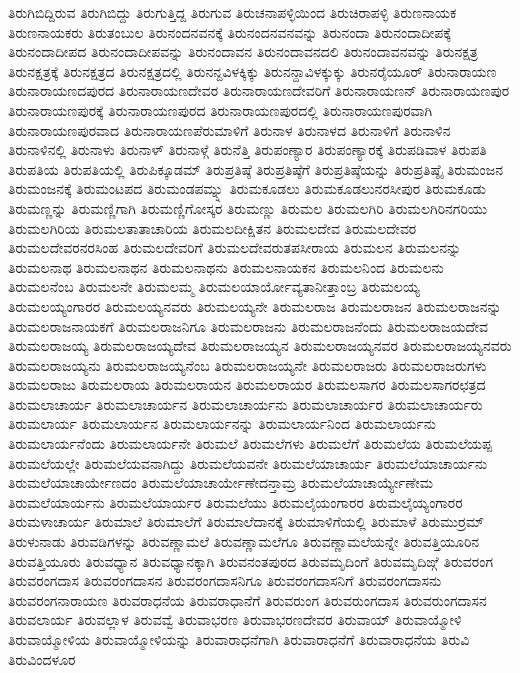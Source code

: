 {ತಿರುಗಿಬಿದ್ದಿರುವ
ತಿರುಗಿಬಿದ್ದು
ತಿರುಗುತ್ತಿದ್ದ
ತಿರುಗುವ
ತಿರುಚನಾಪಳ್ಳಿಯಿಂದ
ತಿರುಚಿರಾಪಳ್ಳಿ
ತಿರುಣನಾಯಕ
ತಿರುಣನಾಯಕರು
ತಿರುತಂಬುಲ
ತಿರುನಂದನವನಕ್ಕೆ
ತಿರುನಂದನವನವನ್ನು
ತಿರುನಂದಾ
ತಿರುನಂದಾದೀಪಕ್ಕೆ
ತಿರುನಂದಾದೀಪದ
ತಿರುನಂದಾದೀಪವನ್ನು
ತಿರುನಂದಾವನ
ತಿರುನಂದಾವನದಲಿ
ತಿರುನಂದಾವನವನ್ನು
ತಿರುನಕ್ಷತ್ರ
ತಿರುನಕ್ಷತ್ರಕ್ಕೆ
ತಿರುನಕ್ಷತ್ರದ
ತಿರುನಕ್ಷತ್ರದಲ್ಲಿ
ತಿರುನನ್ದವಿಳಕ್ಕಿಕ್ಕು
ತಿರುನನ್ದಾವಿಳಕ್ಕುಕ್ಕು
ತಿರುನರೈಯೂರ್
ತಿರುನಾರಾಯಣ
ತಿರುನಾರಾಯಣದಪುರದ
ತಿರುನಾರಾಯಣದೇವರ
ತಿರುನಾರಾಯಣದೇವರಿಗೆ
ತಿರುನಾರಾಯಣನ್
ತಿರುನಾರಾಯಣಪುರ
ತಿರುನಾರಾಯಣಪುರಕ್ಕೆ
ತಿರುನಾರಾಯಣಪುರದ
ತಿರುನಾರಾಯಣಪುರದಲ್ಲಿ
ತಿರುನಾರಾಯಣಪುರವಾಗಿ
ತಿರುನಾರಾಯಣಪುರವಾದ
ತಿರುನಾರಾಯಣಪೆರುಮಾಳಿಗೆ
ತಿರುನಾಳ
ತಿರುನಾಳದ
ತಿರುನಾಳಿಗೆ
ತಿರುನಾಳಿನ
ತಿರುನಾಳಿನಲ್ಲಿ
ತಿರುನಾಳು
ತಿರುನಾಳ್
ತಿರುನಾಳ್ಗೆ
ತಿರುನೆತ್ತಿ
ತಿರುಪಂಣ್ಯಾರ
ತಿರುಪಂಣ್ಯಾರಕ್ಕೆ
ತಿರುಪಡಿವಾಳ
ತಿರುಪತಿ
ತಿರುಪತಿಯ
ತಿರುಪತಿಯಲ್ಲಿ
ತಿರುಪಿಕ್ಕೂಡಮ್
ತಿರುಪ್ರತಿಷ್ಠೆ
ತಿರುಪ್ರತಿಷ್ಠೆಗೆ
ತಿರುಪ್ರತಿಷ್ಠೆಯನ್ನು
ತಿರುಪ್ರತಿಷ್ಠೈ
ತಿರುಮಂಜನ
ತಿರುಮಂಜನಕ್ಕೆ
ತಿರುಮಂಟಪದ
ತಿರುಮಂಡಪಮ್ನ್ನು
ತಿರುಮಕೂಡಲು
ತಿರುಮಕೂಡಲುನರಸೀಪುರ
ತಿರುಮಕೂಡು
ತಿರುಮಣ್ಣನ್ನು
ತಿರುಮಣ್ಣಿಗಾಗಿ
ತಿರುಮಣ್ಣಿಗೋಸ್ಕರ
ತಿರುಮಣ್ಣು
ತಿರುಮಲ
ತಿರುಮಲಗಿರಿ
ತಿರುಮಲಗಿರಿನಗರಿಯು
ತಿರುಮಲಗಿರಿಯ
ತಿರುಮಲತಾತಾಚಾರಿಯ
ತಿರುಮಲದೀಕ್ಷಿತನ
ತಿರುಮಲದೇವ
ತಿರುಮಲದೇವರ
ತಿರುಮಲದೇವರನರಸಿಂಹ
ತಿರುಮಲದೇವರಿಗೆ
ತಿರುಮಲದೇವರುತಪಸೀರಾಯ
ತಿರುಮಲನ
ತಿರುಮಲನನ್ನು
ತಿರುಮಲನಾಥ
ತಿರುಮಲನಾಥನ
ತಿರುಮಲನಾಥನು
ತಿರುಮಲನಾಯಕನ
ತಿರುಮಲನಿಂದ
ತಿರುಮಲನು
ತಿರುಮಲನೆಂಬ
ತಿರುಮಲನೇ
ತಿರುಮಲಮ್ಮ
ತಿರುಮಲಯಾರ್ಯೋವ್ಯತಾನೀತ್ತಾಂಬ್ರ
ತಿರುಮಲಯ್ಯ
ತಿರುಮಲಯ್ಯಂಗಾರರ
ತಿರುಮಲಯ್ಯನವರು
ತಿರುಮಲಯ್ಯನೇ
ತಿರುಮಲರಾಜ
ತಿರುಮಲರಾಜನ
ತಿರುಮಲರಾಜನನ್ನು
ತಿರುಮಲರಾಜನಾಯಕಗೆ
ತಿರುಮಲರಾಜನಿಗೂ
ತಿರುಮಲರಾಜನು
ತಿರುಮಲರಾಜನೆಂದು
ತಿರುಮಲರಾಜಯದೇವ
ತಿರುಮಲರಾಜಯ್ಯ
ತಿರುಮಲರಾಜಯ್ಯದೇವ
ತಿರುಮಲರಾಜಯ್ಯನ
ತಿರುಮಲರಾಜಯ್ಯನವರ
ತಿರುಮಲರಾಜಯ್ಯನವರು
ತಿರುಮಲರಾಜಯ್ಯನು
ತಿರುಮಲರಾಜಯ್ಯನೆಂಬ
ತಿರುಮಲರಾಜಯ್ಯನೇ
ತಿರುಮಲರಾಜರು
ತಿರುಮಲರಾಜರುಗಳು
ತಿರುಮಲರಾಜು
ತಿರುಮಲರಾಯ
ತಿರುಮಲರಾಯನ
ತಿರುಮಲರಾಯರ
ತಿರುಮಲಸಾಗರ
ತಿರುಮಲಸಾಗರಛತ್ರದ
ತಿರುಮಲಾಚಾರ್ಯ
ತಿರುಮಲಾಚಾರ್ಯನ
ತಿರುಮಲಾಚಾರ್ಯನು
ತಿರುಮಲಾಚಾರ್ಯರ
ತಿರುಮಲಾಚಾರ್ಯರು
ತಿರುಮಲಾರ್ಯ
ತಿರುಮಲಾರ್ಯನ
ತಿರುಮಲಾರ್ಯನನ್ನು
ತಿರುಮಲಾರ್ಯನಿಂದ
ತಿರುಮಲಾರ್ಯನು
ತಿರುಮಲಾರ್ಯನೆಂದು
ತಿರುಮಲಾರ್ಯನೇ
ತಿರುಮಲೆ
ತಿರುಮಲೆಗಳು
ತಿರುಮಲೆಗೆ
ತಿರುಮಲೆಯ
ತಿರುಮಲೆಯಪ್ಪ
ತಿರುಮಲೆಯಲ್ಲೇ
ತಿರುಮಲೆಯವನಾಗಿದ್ದು
ತಿರುಮಲೆಯವನೇ
ತಿರುಮಲೆಯಾಚಾರ್ಯ
ತಿರುಮಲೆಯಾಚಾರ್ಯನು
ತಿರುಮಲೆಯಾಚಾರ್ಯೇಣದಂ
ತಿರುಮಲೆಯಾಚಾರ್ಯೇಣೇದನ್ತಾಮ್ರ
ತಿರುಮಲೆಯಾಚಾರ್ಯ್ಯೇಣೇಮ
ತಿರುಮಲೆಯಾರ್ಯನು
ತಿರುಮಲೆಯಾರ್ಯರ
ತಿರುಮಲೆಯು
ತಿರುಮಲೈಯಂಗಾರರ
ತಿರುಮಲೈಯ್ಯಂಗಾರರ
ತಿರುಮಳಾಚಾರ್ಯ
ತಿರುಮಾಲೆ
ತಿರುಮಾಲೆಗೆ
ತಿರುಮಾಲೆದಾನಕ್ಕೆ
ತಿರುಮಾಳಿಗೆಯಲ್ಲಿ
ತಿರುಮಾಳೆ
ತಿರುಮುರ್ರಮ್
ತಿರುಳುನಾಡು
ತಿರುವಡಿಗಳನ್ನು
ತಿರುವಣ್ಣಾಮಲೆ
ತಿರುವಣ್ಣಾಮಲೆಗೂ
ತಿರುವಣ್ಣಾಮಲೆಯನ್ನೇ
ತಿರುವತ್ತಿಯೂರಿನ
ತಿರುವತ್ತಿಯೂರು
ತಿರುವಧ್ಯಾನ
ತಿರುವಧ್ಯಾನಕ್ಕಾಗಿ
ತಿರುವನಂತಪುರದ
ತಿರುವಮೃದಿಂಗೆ
ತಿರುವಮೃದಿಙ್ಗೆ
ತಿರುವರಂಗ
ತಿರುವರಂಗದಾಸ
ತಿರುವರಂಗದಾಸನ
ತಿರುವರಂಗದಾಸನಿಗೂ
ತಿರುವರಂಗದಾಸನಿಗೆ
ತಿರುವರಂಗದಾಸನು
ತಿರುವರಂಗನಾರಾಯಣ
ತಿರುವರಾಧನೆಯ
ತಿರುವರಾಧಾನೆಗೆ
ತಿರುವರುಂಗ
ತಿರುವರುಂಗದಾಸ
ತಿರುವರುಂಗದಾಸನ
ತಿರುವಲಾರ್ಯ
ತಿರುವಲ್ಲಾಳ
ತಿರುವವ್ವೆ
ತಿರುವಾಭರಣ
ತಿರುವಾಭರಣದೇವರ
ತಿರುವಾಯ್
ತಿರುವಾಯ್ಮೋಳಿ
ತಿರುವಾಯ್ಮೋಳಿಯ
ತಿರುವಾಯ್ಮೋಳಿಯನ್ನು
ತಿರುವಾರಾಧನೆಗಾಗಿ
ತಿರುವಾರಾಧನೆಗೆ
ತಿರುವಾರಾಧನೆಯ
ತಿರುವಿ
ತಿರುವಿಂದಳೂರ
}
